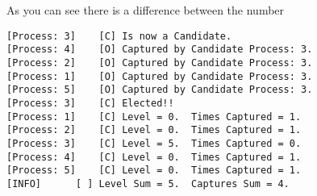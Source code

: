 As you can see there is a difference between the number

\begin{Verbatim}[frame=single]
[Process: 3]	[C]	Is now a Candidate.
[Process: 4]	[O]	Captured by Candidate Process: 3.
[Process: 2]	[O]	Captured by Candidate Process: 3.
[Process: 1]	[O]	Captured by Candidate Process: 3.
[Process: 5]	[O]	Captured by Candidate Process: 3.
[Process: 3]	[C]	Elected!! 
[Process: 1]	[C]	Level = 0.	Times Captured = 1.
[Process: 2]	[C]	Level = 0.	Times Captured = 1.
[Process: 3]	[C]	Level = 5.	Times Captured = 0.
[Process: 4]	[C]	Level = 0.	Times Captured = 1.
[Process: 5]	[C]	Level = 0.	Times Captured = 1.
[INFO]		[ ]	Level Sum = 5.	Captures Sum = 4.
\end{Verbatim}


